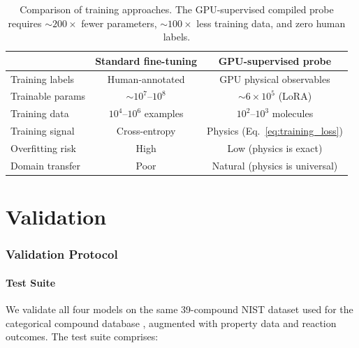 \documentclass[11pt,twocolumn,a4paper]{article}
\theoremstyle{definition}
\theoremstyle{remark}
\begin{document}
\begin{table}[h]
\centering
\small
\begin{tabular}{lcc}
\toprule
& \textbf{Standard fine-tuning} & \textbf{GPU-supervised probe} \\
\midrule
Training labels & Human-annotated & GPU physical observables \\
Trainable params & $\sim 10^7$--$10^8$ & $\sim 6 \times 10^5$ (LoRA) \\
Training data & $10^4$--$10^6$ examples & $10^2$--$10^3$ molecules \\
Training signal & Cross-entropy & Physics (Eq.~\ref{eq:training_loss}) \\
Overfitting risk & High & Low (physics is exact) \\
Domain transfer & Poor & Natural (physics is universal) \\
\bottomrule
\end{tabular}
\caption{Comparison of training approaches. The GPU-supervised compiled probe requires $\sim 200\times$ fewer parameters, $\sim 100\times$ less training data, and zero human labels.}
\label{tab:training_comparison}
\end{table}



\part{Validation}

\section{Validation Protocol}
\label{sec:validation}

\subsection{Test Suite}

We validate all four models on the same 39-compound NIST dataset used for the categorical compound database \citep{sachikonye2025c}, augmented with property data and reaction outcomes. The test suite comprises:
\end{document}
